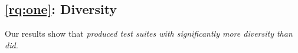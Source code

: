






\subsection{\ref{rq:one}: Diversity}

Our results show that \emph{\tool produced test suites with significantly more diversity than \bls did.} 

